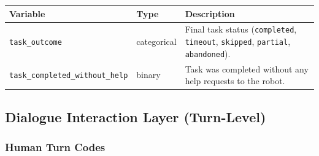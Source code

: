 \documentclass[
  authoryear,
  doubleblind,
  3p]{elsarticle}
\newcounter{none} %
\begin{document}
{\def\LTcaptype{none} %
\begin{longtable}[]{@{}
  >{\raggedright\arraybackslash}p{}
  >{\raggedright\arraybackslash}p{}
  >{\raggedright\arraybackslash}p{}@{}}
\toprule\noalign{}
\begin{minipage}[b]{\linewidth}\raggedright
Variable
\end{minipage} & \begin{minipage}[b]{\linewidth}\raggedright
Type
\end{minipage} & \begin{minipage}[b]{\linewidth}\raggedright
Description
\end{minipage} \\
\midrule\noalign{}
\endhead
\bottomrule\noalign{}
\endlastfoot
\texttt{task\_outcome} & categorical & Final task status
(\texttt{completed}, \texttt{timeout}, \texttt{skipped},
\texttt{partial}, \texttt{abandoned}). \\
\texttt{task\_completed\_without\_help} & binary & Task was completed
without any help requests to the robot. \\
\end{longtable}
}

\subsection{Dialogue Interaction Layer
(Turn-Level)}\label{dialogue-interaction-layer-turn-level}

\subsubsection*{Human Turn Codes}\label{human-turn-codes}
\end{document}
